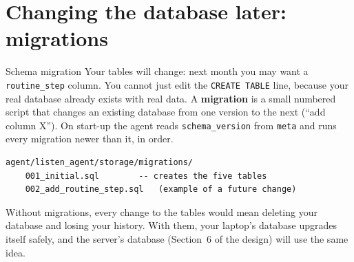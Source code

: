 \documentclass[11pt,a4paper]{article}
\begin{document}
\section{Changing the database later: migrations}

\begin{concept}{Schema migration}
Your tables will change: next month you may want a \texttt{routine\_step} column. You cannot just
edit the \texttt{CREATE TABLE} line, because your real database already exists with real data.
A \textbf{migration} is a small numbered script that changes an existing database from one
version to the next (``add column X''). On start-up the agent reads \texttt{schema\_version}
from \texttt{meta} and runs every migration newer than it, in order.
\end{concept}

\begin{lstlisting}
agent/listen_agent/storage/migrations/
    001_initial.sql        -- creates the five tables
    002_add_routine_step.sql   (example of a future change)
\end{lstlisting}

\begin{why}
Without migrations, every change to the tables would mean deleting your database and losing your
history. With them, your laptop's database upgrades itself safely, and the server's database
(Section~6 of the design) will use the same idea.
\end{why}

\end{document}
